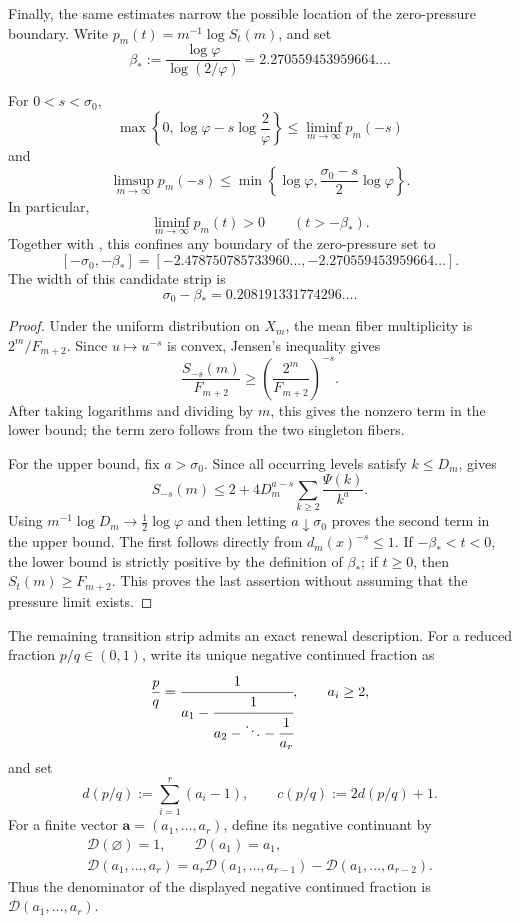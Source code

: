 Finally, the same estimates narrow the possible location of the zero-pressure
boundary.  Write \(p_m(t)=m^{-1}\log S_t(m)\), and set
\[
 \beta_*:=\frac{\log\varphi}{\log(2/\varphi)}
 =2.270559453959664\ldots.
\]

\begin{theorem}
\label{thm:pressure-transition-strip}
For \(0<s<\sigma_0\),
\[
 \max\left\{0,\log\varphi-s\log\frac2\varphi\right\}
 \le\liminf_{m\to\infty}p_m(-s)
\]
and
\[
 \limsup_{m\to\infty}p_m(-s)
 \le\min\left\{\log\varphi,
       \frac{\sigma_0-s}{2}\log\varphi\right\}.
\]
In particular,
\[
 \liminf_{m\to\infty}p_m(t)>0\qquad(t>-\beta_*).
\]
Together with , this confines any
boundary of the zero-pressure set to
\[
 [-\sigma_0,-\beta_*]
 =[-2.478750785733960\ldots,-2.270559453959664\ldots].
\]
The width of this candidate strip is
\[
 \sigma_0-\beta_*=0.208191331774296\ldots.
\]
\end{theorem}

\begin{proof}
Under the uniform distribution on \(X_m\), the mean fiber multiplicity is
\(2^m/F_{m+2}\).  Since \(u\mapsto u^{-s}\) is convex, Jensen's inequality
gives
\[
 \frac{S_{-s}(m)}{F_{m+2}}
 \ge\left(\frac{2^m}{F_{m+2}}\right)^{-s}.
\]
After taking logarithms and dividing by \(m\), this gives the nonzero term in
the lower bound; the term zero follows from the two singleton fibers.

For the upper bound, fix \(a>\sigma_0\).  Since all occurring levels satisfy
\(k\le D_m\),  gives
\[
 S_{-s}(m)
 \le2+4D_m^{a-s}\sum_{k\ge2}\frac{\Psi(k)}{k^a}.
\]
Using \(m^{-1}\log D_m\to\tfrac12\log\varphi\) and then letting
\(a\downarrow\sigma_0\) proves the second term in the upper bound.  The
first follows directly from \(d_m(x)^{-s}\le1\).  If
\(-\beta_*<t<0\), the lower bound is strictly positive by the definition of
\(\beta_*\); if \(t\ge0\), then \(S_t(m)\ge F_{m+2}\).  This proves the
last assertion without assuming that the pressure limit exists.
\end{proof}

The remaining transition strip admits an exact renewal description.  For a
reduced fraction \(p/q\in(0,1)\), write its unique negative continued fraction
as
\[
 \frac pq=
 \cfrac1{a_1-\cfrac1{a_2-\ddots-\cfrac1{a_r}}},
 \qquad a_i\ge2,
\]
and set
\[
 d(p/q):=\sum_{i=1}^r(a_i-1),
 \qquad c(p/q):=2d(p/q)+1.
\]
For a finite vector \(\mathbf a=(a_1,\ldots,a_r)\), define its negative
continuant by
\[
 \begin{gathered}
  \mathcal D(\varnothing)=1,\qquad \mathcal D(a_1)=a_1,\\
  \mathcal D(a_1,\ldots,a_r)
  =a_r\mathcal D(a_1,\ldots,a_{r-1})
   -\mathcal D(a_1,\ldots,a_{r-2}).
 \end{gathered}
\]
Thus the denominator of the displayed negative continued fraction is
\(\mathcal D(a_1,\ldots,a_r)\).

